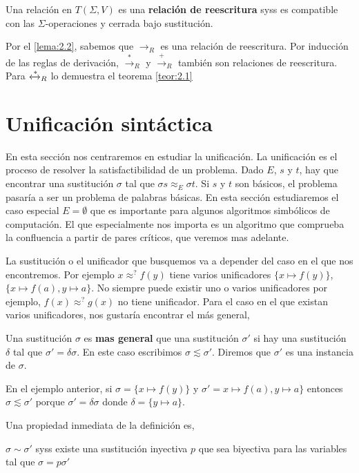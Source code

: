 \begin{defi}
  Una relación en $T(\Sigma, V)$ es una \textbf{relación de reescritura} syss
  es compatible con las $\Sigma$-operaciones y cerrada bajo
  sustitución.
\end{defi}

Por el \ref{lema:2.2}, sabemos que $\rightarrow_R$ es una relación de
reescritura. Por inducción de las reglas de derivación,
$\xrightarrow{*}_R$ y $\xrightarrow{+}_R$ también son relaciones de
reescritura. Para $\xleftrightarrow{*}_R$ lo demuestra el teorema \ref{teor:2.1}

\section{Unificación sintáctica}

En esta sección nos centraremos en estudiar la unificación. La
unificación es el proceso de resolver la satisfactibilidad de un
problema. Dado $E$, $s$ y $t$, hay que encontrar una sustitución
$\sigma$ tal que $\sigma s \approx _E \sigma t$. Si $s$ y $t$ son
básicos, el problema pasaría a ser un problema de palabras básicas. En
esta sección estudiaremos el caso especial $E = \emptyset$ que es
importante para algunos algoritmos simbólicos de computación. El que
especialmente nos importa es un algoritmo que comprueba la confluencia
a partir de pares críticos, que veremos mas adelante.

La sustitución o el unificador que busquemos va a
depender del caso en el que nos encontremos. Por ejemplo $x \approx^?
f(y)$ tiene varios unificadores $\{x \mapsto f(y) \}$, $\{x \mapsto
f(a), y \mapsto a\}$. No siempre puede existir uno o varios
unificadores por ejemplo, $f(x) \approx^? g(x)$ no tiene
unificador. Para el caso en el que existan varios unificadores, nos
gustaría encontrar el más general,

\begin{defi}
  Una sustitución $\sigma$ es \textbf{mas general} que una sustitución
  $\sigma'$ si hay una sustitución $\delta$ tal que $ \sigma' = \delta
  \sigma$. En este caso escribimos $\sigma \lesssim \sigma'$. Diremos
  que $\sigma'$ es una instancia de $\sigma$.
\end{defi}

En el ejemplo anterior, si $\sigma = \{x \mapsto f(y) \}$ y
$\sigma' = x \mapsto f(a), y \mapsto a\}$ entonces
$\sigma \lesssim \sigma'$ porque $\sigma' = \delta \sigma$ donde
$\delta = \{ y \mapsto a \}$.

Una propiedad inmediata de la definición es,
\begin{lema} \label{lema:3.1}
  $\sigma \sim \sigma '$ syss existe una sustitución inyectiva $p$ que
  sea biyectiva para las variables tal que $\sigma = p \sigma '$
\end{lema}

